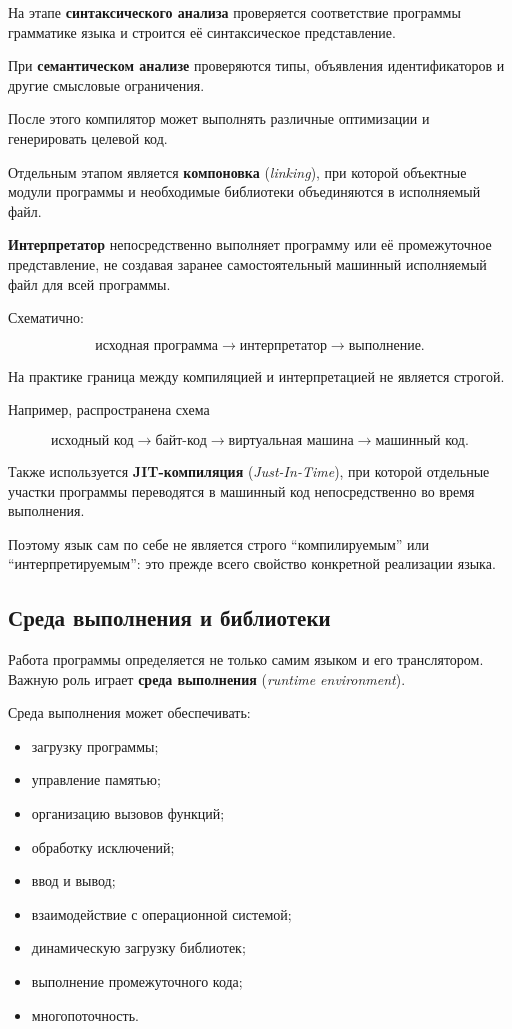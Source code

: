 На этапе \textbf{синтаксического анализа} проверяется соответствие программы грамматике языка и строится её синтаксическое представление.

При \textbf{семантическом анализе} проверяются типы, объявления идентификаторов и другие смысловые ограничения.

После этого компилятор может выполнять различные оптимизации и генерировать целевой код.

Отдельным этапом является \textbf{компоновка} (\textit{linking}), при которой объектные модули программы и необходимые библиотеки объединяются в исполняемый файл.

\textbf{Интерпретатор} непосредственно выполняет программу или её промежуточное представление, не создавая заранее самостоятельный машинный исполняемый файл для всей программы.

Схематично:

\[
\text{исходная программа}
\rightarrow
\text{интерпретатор}
\rightarrow
\text{выполнение}.
\]

На практике граница между компиляцией и интерпретацией не является строгой.

Например, распространена схема

\[
\text{исходный код}
\rightarrow
\text{байт-код}
\rightarrow
\text{виртуальная машина}
\rightarrow
\text{машинный код}.
\]

Также используется \textbf{JIT-компиляция} (\textit{Just-In-Time}), при которой отдельные участки программы переводятся в машинный код непосредственно во время выполнения.

Поэтому язык сам по себе не является строго ``компилируемым'' или ``интерпретируемым'': это прежде всего свойство конкретной реализации языка.


\subsection{Среда выполнения и библиотеки}

Работа программы определяется не только самим языком и его транслятором. Важную роль играет \textbf{среда выполнения} (\textit{runtime environment}).

Среда выполнения может обеспечивать:
\begin{itemize}
	\item загрузку программы;
	\item управление памятью;
	\item организацию вызовов функций;
	\item обработку исключений;
	\item ввод и вывод;
	\item взаимодействие с операционной системой;
	\item динамическую загрузку библиотек;
	\item выполнение промежуточного кода;
	\item многопоточность.
\end{itemize}

